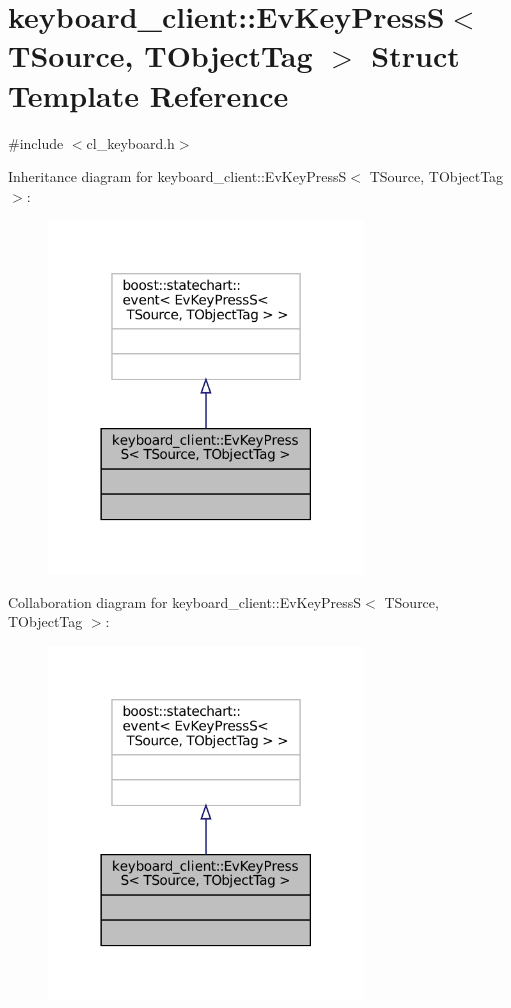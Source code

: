 \hypertarget{structkeyboard__client_1_1EvKeyPressS}{}\section{keyboard\+\_\+client\+:\+:Ev\+Key\+PressS$<$ T\+Source, T\+Object\+Tag $>$ Struct Template Reference}
\label{structkeyboard__client_1_1EvKeyPressS}


{\ttfamily \#include $<$cl\+\_\+keyboard.\+h$>$}



Inheritance diagram for keyboard\+\_\+client\+:\+:Ev\+Key\+PressS$<$ T\+Source, T\+Object\+Tag $>$\+:
\nopagebreak
\begin{figure}[H]
\begin{center}
\leavevmode
\includegraphics[width=237pt]{structkeyboard__client_1_1EvKeyPressS__inherit__graph}
\end{center}
\end{figure}


Collaboration diagram for keyboard\+\_\+client\+:\+:Ev\+Key\+PressS$<$ T\+Source, T\+Object\+Tag $>$\+:
\nopagebreak
\begin{figure}[H]
\begin{center}
\leavevmode
\includegraphics[width=237pt]{structkeyboard__client_1_1EvKeyPressS__coll__graph}
\end{center}
\end{figure}


